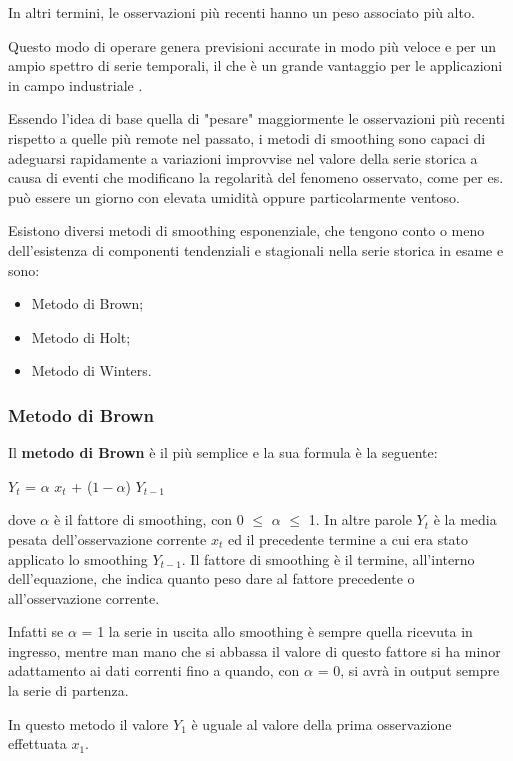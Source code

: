 \documentclass[12pt,a4paper,twoside,openright]{book}
\begin{document}
In altri termini, le osservazioni più recenti hanno un peso associato più alto. 

Questo modo di operare genera previsioni accurate in modo più veloce e per un ampio spettro di serie temporali, il che è un grande vantaggio per le applicazioni in campo industriale \cite{7a}.

Essendo l'idea di base quella di "pesare" maggiormente le osservazioni più recenti rispetto a quelle più remote nel passato, i metodi di smoothing sono capaci di adeguarsi rapidamente a variazioni improvvise nel valore della serie storica a causa di eventi che modificano la regolarità del fenomeno osservato, come per es. può essere un giorno con elevata umidità oppure particolarmente ventoso. 

Esistono diversi metodi di smoothing esponenziale, che tengono conto o meno dell'esistenza di componenti tendenziali e stagionali nella serie storica in esame e sono:
\begin{itemize}
\item Metodo di Brown;
\item Metodo di Holt;
\item Metodo di Winters.
\end{itemize}

\subsubsection{Metodo di Brown}
Il {\bfseries metodo di Brown} è il più semplice e la sua formula è la seguente:
\begin{center}
$Y_{t}$ = $\alpha$ $x_{t}$ + (${1 - \alpha }$) $Y_{t-1}$
\end{center}

dove $\alpha$ è il fattore di smoothing, con 0 $\leq$ $\alpha$  $\leq$ 1. In altre parole $Y_{t}$ è la media pesata dell'osservazione corrente $x_{t}$ ed il precedente termine a cui era stato applicato lo smoothing $Y_{t-1}$. Il fattore di smoothing è il termine, all'interno dell'equazione, che indica quanto peso dare al fattore precedente o all'osservazione corrente. 

Infatti se $\alpha$ = 1 la serie in uscita allo smoothing è sempre quella ricevuta in ingresso, mentre man mano che si abbassa il valore di questo fattore si ha minor adattamento ai dati correnti fino a quando, con $\alpha$ = 0, si avrà in output sempre la serie di partenza.

In questo metodo il valore $Y_{1}$ è uguale al valore della prima osservazione effettuata $x_{1}$.
\end{document}
